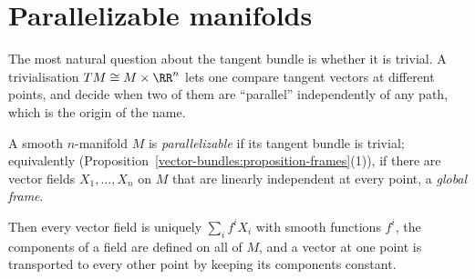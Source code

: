 \section{Parallelizable manifolds}\label{vector-bundles:section-parallelizable}

The most natural question about the tangent bundle is whether it is trivial. A trivialisation $TM \cong M \times \RR^n$ lets one compare tangent vectors at different points, and decide when two of them
are ``parallel'' independently of any path, which is the origin of the name.

\begin{definition}\label{vector-bundles:definition-parallelizable}
A smooth $n$-manifold $M$ is \emph{parallelizable} if its tangent bundle is trivial; equivalently (Proposition~\ref{vector-bundles:proposition-frames}(1)), if there are vector fields $X_1, \ldots, X_n$ on $M$ that are
linearly independent at every point, a \emph{global frame}.
\end{definition}

Then every vector field is uniquely $\sum_if^iX_i$ with smooth functions $f^i$, the components of a field are defined on all of $M$, and a vector at one point is transported to every other point by
keeping its components constant.

